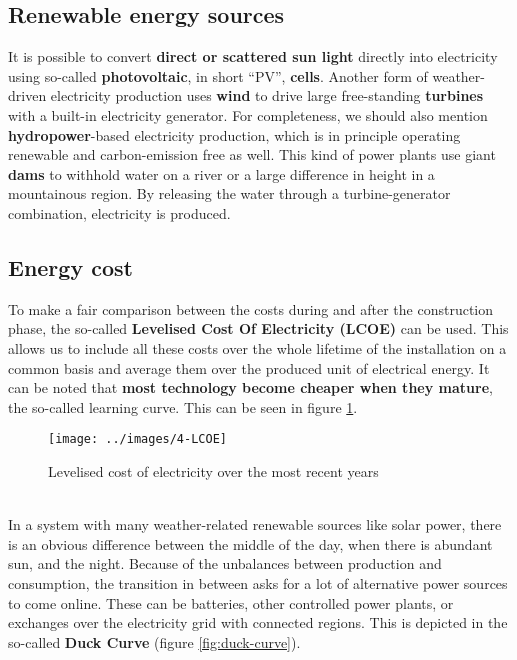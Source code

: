 \documentclass[../summary.tex]{subfiles}
\begin{document}
	\subsection{Renewable energy sources}
	
	It is possible to convert \textbf{direct or scattered sun light} directly into electricity using so-called \textbf{photovoltaic}, in short “PV”, \textbf{cells}. Another form of weather-driven electricity production uses \textbf{wind} to drive large free-standing \textbf{turbines} with a built-in electricity generator. For completeness, we should also mention \textbf{hydropower}-based electricity production, which is in principle operating renewable and carbon-emission free as well. This kind of power plants use giant \textbf{dams} to withhold water on a river or a large difference in height in a mountainous region. By releasing the water through a turbine-generator combination, electricity is produced.
	
	\subsection{Energy cost}
	
	To make a fair comparison between the costs during and after the construction phase, the so-called \textbf{Levelised Cost Of Electricity (LCOE)} can be used. This allows us to include all these costs over the whole lifetime of the installation on a common basis and average them over the produced unit of electrical energy. It can be noted that \textbf{most technology become cheaper when they mature}, the so-called learning curve. This can be seen in figure \ref{fig:lcoe}.
	
	\begin{figure}[H]
		\centering
		\texttt{[image: ../images/4-LCOE]}
		\caption{Levelised cost of electricity over the most recent years}
		\label{fig:lcoe}
	\end{figure}
	
	\ \\
	In a system with many weather-related renewable sources like solar power, there is an obvious difference between the middle of the day, when there is abundant sun, and the night. Because of the unbalances between production and consumption, the transition in between asks for a lot of alternative power sources to come online. These can be batteries, other controlled power plants, or exchanges over the electricity grid with connected regions. This is depicted in the so-called \textbf{Duck Curve} (figure \ref{fig:duck-curve}). 
	
\end{document}
